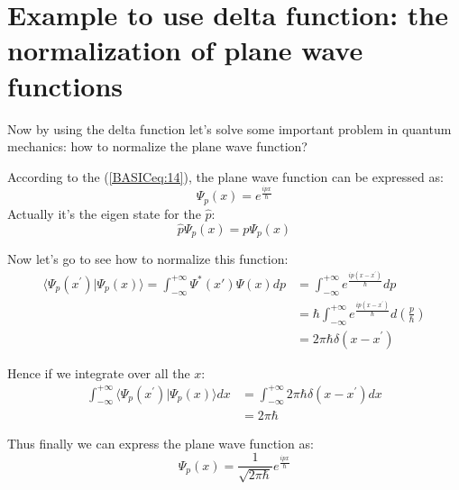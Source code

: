 \section{Example to use delta function:
the normalization of plane wave functions}
\label{sec:normalization_delta_function}
%
%
%
%
Now by using the delta function let's solve some important problem
in quantum mechanics: how to normalize the plane wave function?

According to the (\ref{BASICeq:14}), the plane wave function can be
expressed as:
\begin{equation}\label{}
\Psi_{p}(x) = e^{\frac{ipx}{\hbar}}
\end{equation}
Actually it's the eigen state for the $\hat{p}$:
\begin{equation}\label{}
\hat{p}\Psi_{p}(x) = p\Psi_{p}(x)
\end{equation}

Now let's go to see how to normalize this function:
\begin{equation}\label{}
\begin{split}
  \langle \Psi_{p}(x^{'})|\Psi_{p}(x)\rangle
  =\int_{-\infty}^{+\infty}\Psi^{*}(x')\Psi(x)dp
  &= \int_{-\infty}^{+\infty} e^{\frac{ip(x-x^{'})}{\hbar}}dp \\
  &= \hbar\int_{-\infty}^{+\infty} e^{\frac{ip(x-x^{'})}{\hbar}}
  d\left(\frac{p}{\hbar}\right) \\
  &= 2\pi\hbar\delta(x-x^{'})
\end{split}
\end{equation}

Hence if we integrate over all the $x$:
\begin{equation}\label{}
\begin{split}
  \int_{-\infty}^{+\infty}
  \langle \Psi_{p}(x^{'})|\Psi_{p}(x)\rangle dx
  &= \int_{-\infty}^{+\infty} 2\pi\hbar\delta(x-x^{'}) dx \\
    &= 2\pi\hbar
\end{split}
\end{equation}

Thus finally we can express the plane wave function as:
\begin{equation}\label{}
\Psi_{p}(x) = \frac{1}{\sqrt{2\pi\hbar}}e^{\frac{ipx}{\hbar}}
\end{equation}








